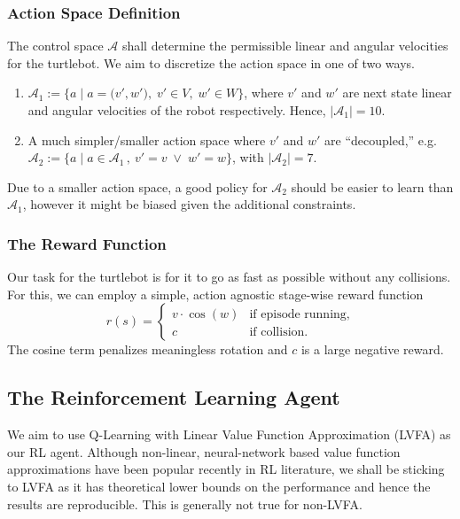 \documentclass{article}
\begin{document}
\subsubsection{Action Space Definition}
The control space $\mathcal{A}$ shall determine the permissible linear and angular velocities for the turtlebot. We aim to discretize the action space in one of two ways.
\begin{enumerate}
    \item $\mathcal{A}_1 := \Big\{ a \;\Big\vert\; a = \big(v', w'\big), \;v'\in V, \;w'\in W \Big\}$, where $v'$ and $w'$ are next state linear and angular velocities of the robot respectively. Hence, $\vert \mathcal{A}_1 \vert = 10$.
    \item A much simpler/smaller action space where $v'$ and $w'$ are ``decoupled,'' e.g. $\mathcal{A}_2 := \big\{ a\; \big\vert \;a \in \mathcal{A}_1\,,\: v' = v \;\lor\; w' = w \big\}$, with $\vert \mathcal{A}_2 \vert = 7$.
\end{enumerate}
Due to a smaller action space, a good policy for $\mathcal{A}_2$ should be easier to learn than $\mathcal{A}_1$, however it might be biased given the additional constraints.

\subsubsection{The Reward Function}
Our task for the turtlebot is for it to go as fast as possible without any collisions. For this, we can employ a simple, action agnostic stage-wise reward function
\begin{equation*}
  r(s) =
  \begin{cases}
    v \cdot \cos(w) & \text{if episode running,} \\
    c & \text{if collision.}
  \end{cases}
\end{equation*}
The cosine term penalizes meaningless rotation and $c$ is a large negative reward. %

\subsection{The Reinforcement Learning Agent}
We aim to use Q-Learning with Linear Value Function Approximation (LVFA) as our RL agent. Although non-linear, neural-network based value function approximations have been popular recently in RL literature, we shall be sticking to LVFA as it has theoretical lower bounds on the performance and hence the results are reproducible. This is generally not true for non-LVFA.
\end{document}
